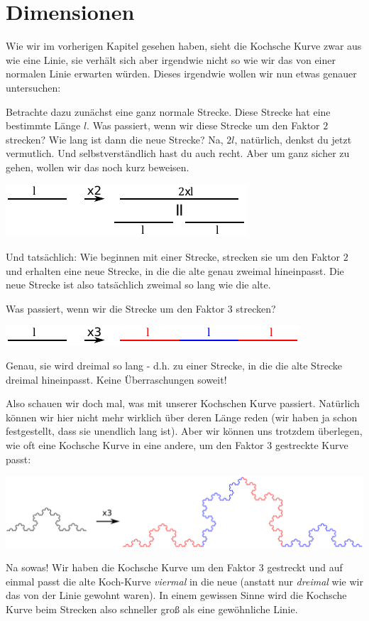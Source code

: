 \documentclass[a4paper,ngerman,12pt]{scrartcl}
\theoremstyle{definition}
\theoremstyle{plain}
\theoremstyle{remark}
\begin{document}
\section{Dimensionen}

Wie wir im vorherigen Kapitel gesehen haben, sieht die Kochsche Kurve zwar aus wie eine Linie, sie verhält sich aber irgendwie nicht so wie wir das von einer normalen Linie erwarten würden. Dieses \glqq irgendwie\grqq{} wollen wir nun etwas genauer untersuchen:

Betrachte dazu zunächst eine ganz normale Strecke. Diese Strecke hat eine bestimmte Länge $l$. Was passiert, wenn wir diese Strecke um den Faktor $2$ strecken? Wie lang ist dann die neue Strecke? Na, $2l$, natürlich, denkst du jetzt vermutlich. Und selbstverständlich hast du auch recht. Aber um ganz sicher zu gehen, wollen wir das noch kurz beweisen.

\begin{center}
	\includegraphics[width=.5\textwidth]{Bilder/Linie_vergroessern.pdf}
\end{center}

Und tatsächlich: Wie beginnen mit einer Strecke, strecken sie um den Faktor $2$ und erhalten eine neue Strecke, in die die alte genau zweimal hineinpasst. Die neue Strecke ist also tatsächlich zweimal so lang wie die alte.

Was passiert, wenn wir die Strecke um den Faktor $3$ strecken?
\begin{center}
	\includegraphics[width=.7\textwidth]{Bilder/Linie_vergroessern2.pdf}
\end{center}
Genau, sie wird dreimal so lang - d.h. zu einer Strecke, in die die alte Strecke dreimal hineinpasst. Keine Überraschungen soweit!

Also schauen wir doch mal, was mit unserer Kochschen Kurve passiert. Natürlich können wir hier nicht mehr wirklich über deren Länge reden (wir haben ja schon festgestellt, dass sie unendlich lang ist). Aber wir können uns trotzdem überlegen, wie oft eine Kochsche Kurve in eine andere, um den Faktor $3$ gestreckte Kurve passt:
\begin{center}
	\includegraphics[width=.7\textwidth]{Bilder/KochKurve_vergroessern.pdf}
\end{center}
Na sowas! Wir haben die Kochsche Kurve um den Faktor $3$ gestreckt und auf einmal passt die alte Koch-Kurve \emph{viermal} in die neue (anstatt nur \emph{dreimal} wie wir das von der Linie gewohnt waren). In einem gewissen Sinne wird die Kochsche Kurve beim Strecken also \glqq schneller groß\grqq{} als eine gewöhnliche Linie.
\end{document}
